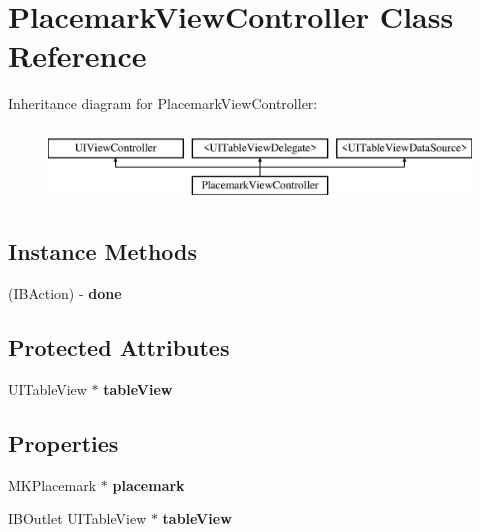 \hypertarget{interface_placemark_view_controller}{\section{Placemark\-View\-Controller Class Reference}
\label{interface_placemark_view_controller}
}
Inheritance diagram for Placemark\-View\-Controller\-:\begin{figure}[H]
\begin{center}
\leavevmode
\includegraphics[height=2.000000cm]{interface_placemark_view_controller}
\end{center}
\end{figure}
\subsection*{Instance Methods}
\begin{DoxyCompactItemize}
\item 
\hypertarget{interface_placemark_view_controller_a545e2ce893f90ae5c47a50c99557ec33}{(I\-B\-Action) -\/ {\bfseries done}}\label{interface_placemark_view_controller_a545e2ce893f90ae5c47a50c99557ec33}

\end{DoxyCompactItemize}
\subsection*{Protected Attributes}
\begin{DoxyCompactItemize}
\item 
\hypertarget{interface_placemark_view_controller_a36834ba2647608541c2f1a4a85be87bb}{U\-I\-Table\-View $\ast$ {\bfseries table\-View}}\label{interface_placemark_view_controller_a36834ba2647608541c2f1a4a85be87bb}

\end{DoxyCompactItemize}
\subsection*{Properties}
\begin{DoxyCompactItemize}
\item 
\hypertarget{interface_placemark_view_controller_a878263909b0235ddccd1ad6171fc2325}{M\-K\-Placemark $\ast$ {\bfseries placemark}}\label{interface_placemark_view_controller_a878263909b0235ddccd1ad6171fc2325}

\item 
\hypertarget{interface_placemark_view_controller_a0eda8ceb83861639e0ee31b816a175c4}{I\-B\-Outlet U\-I\-Table\-View $\ast$ {\bfseries table\-View}}\label{interface_placemark_view_controller_a0eda8ceb83861639e0ee31b816a175c4}

\end{DoxyCompactItemize}


